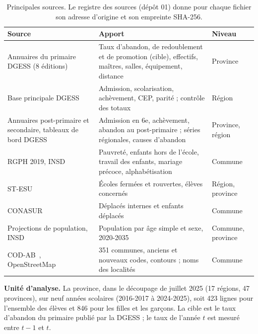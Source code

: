\documentclass{article}
\begin{document}
\begin{table}[!t]
\centering
\footnotesize
\begin{tabularx}{\columnwidth}{@{}L{2.75cm} Y L{1.15cm}@{}}
\toprule
Source & Apport & Niveau \\
\midrule
Annuaires du primaire DGESS (8 éditions)~\cite{dgess_annuaires} & Taux d'abandon, de redoublement et de promotion (cible), effectifs, maîtres, salles, équipement, distance & Province \\
Base principale DGESS~\cite{dgess_base} & Admission, scolarisation, achèvement, CEP, parité ; contrôle des totaux & Région \\
Annuaires post-primaire et secondaire, tableaux de bord DGESS~\cite{dgess_pps,dgess_tdb} & Admission en 6e, achèvement, abandon au post-primaire ; séries régionales, causes d'abandon & Province, région \\
RGPH 2019, INSD~\cite{insd_rgph,insd_pauvrete} & Pauvreté, enfants hors de l'école, travail des enfants, mariage précoce, alphabétisation & Commune \\
ST-ESU~\cite{stesu} & Écoles fermées et rouvertes, élèves concernés & Région, province \\
CONASUR~\cite{conasur} & Déplacés internes et enfants déplacés & Commune \\
Projections de population, INSD~\cite{insd_projections} & Population par âge simple et sexe, 2020-2035 & Commune, province \\
COD-AB~\cite{codab}, OpenStreetMap~\cite{hotosm} & 351 communes, anciens et nouveaux codes, contours ; noms des localités & Commune \\
\bottomrule
\end{tabularx}
\caption{Principales sources. Le registre des sources (dépôt 01) donne pour chaque fichier son adresse d'origine et son empreinte SHA-256.}
\label{tab:sources}
\end{table}

\textbf{Unité d'analyse.} La province, dans le découpage de juillet 2025 (17 régions, 47 provinces), sur neuf années scolaires (2016-2017 à 2024-2025), soit 423 lignes pour l'ensemble des élèves et 846 pour les filles et les garçons. La cible est le taux d'abandon du primaire publié par la DGESS ; le taux de l'année $t$ est mesuré entre $t-1$ et $t$.
\end{document}
